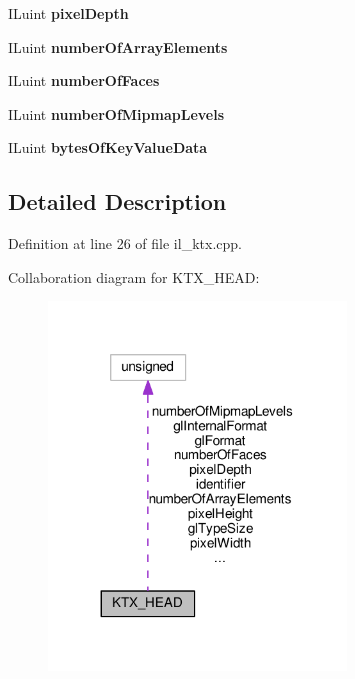\begin{DoxyCompactItemize}
I\+Luint {\bfseries pixel\+Depth}
\item 
\mbox{\label{structKTX__HEAD_a3eeee0d5d15a1a76c892262d5de2f4b4}} 
I\+Luint {\bfseries number\+Of\+Array\+Elements}
\item 
\mbox{\label{structKTX__HEAD_a39886e43fd223203dda627d3578fe976}} 
I\+Luint {\bfseries number\+Of\+Faces}
\item 
\mbox{\label{structKTX__HEAD_a32ffa4c3787553d55e5c37d5235bd43c}} 
I\+Luint {\bfseries number\+Of\+Mipmap\+Levels}
\item 
\mbox{\label{structKTX__HEAD_a3c79fba94439bda96e5a35858421f725}} 
I\+Luint {\bfseries bytes\+Of\+Key\+Value\+Data}
\end{DoxyCompactItemize}


\subsection{Detailed Description}


Definition at line 26 of file il\+\_\+ktx.\+cpp.



Collaboration diagram for K\+T\+X\+\_\+\+H\+E\+AD\+:
\nopagebreak
\begin{figure}[H]
\begin{center}
\leavevmode
\includegraphics[width=224pt]{d8/d72/structKTX__HEAD__coll__graph}
\end{center}
\end{figure}


